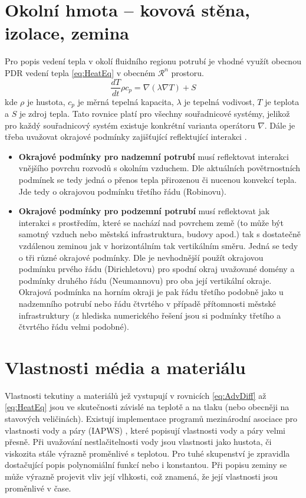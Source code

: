 \section{Okolní hmota – kovová stěna, izolace, zemina}
\label{sec:SurroundingMass}
Pro popis vedení tepla v okolí fluidního regionu potrubí je vhodné využít
obecnou PDR vedení tepla \ref{eq:HeatEq} v obecném \(\mathcal{R}^n\) prostoru.
\begin{equation}
  \label{eq:HeatEq}
  \frac{dT}{dt}\rho{c_p}=\nabla(\lambda\nabla{T})+S
\end{equation}
kde \(\rho\) je hustota, \(c_p\) je měrná tepelná kapacita, \(\lambda\) je
tepelná vodivost, \(T\) je teplota a \(S\) je zdroj tepla. Tato rovnice platí
pro všechny souřadnicové systémy, jelikož pro každý souřadnicový systém
existuje konkrétní varianta operátoru \(\nabla\). Dále je třeba uvažovat
okrajové podmínky zajišťující reflektující interakci .
\begin{itemize}
  \item
    \textbf{Okrajové podmínky pro nadzemní potrubí} musí reflektovat interakci
    vnějšího povrchu rozvodů s okolním vzduchem. Dle aktuálních povětrnostních
    podmínek se tedy jedná o přenos tepla přirozenou či nucenou
    konvekcí tepla. Jde tedy o okrajovou podmínku třetího řádu (Robinovu). 
  \item
    \textbf{Okrajové podmínky pro podzemní potrubí} musí reflektovat jak
    interakci s prostředím, které se nachází nad povrchem země (to může být
    samotný vzduch nebo městská infrastruktura, budovy apod.) tak s dostatečně
    vzdálenou zeminou jak v horizontálním tak vertikálním směru. Jedná se tedy
    o tři různé okrajové podmínky. Dle  je nevhodnější použít
    okrajovou podmínku prvého řádu (Dirichletovu) pro spodní okraj uvažované
    domény a podmínky druhého řádu (Neumannovu) pro oba její vertikální okraje.
    Okrajová podmínka na horním okraji je pak řádu třetího podobně jako u
    nadzemního potrubí nebo řádu čtvrtého v případě přítomnosti městské
    infrastruktury (z hlediska numerického řešení jsou si podmínky třetího a
    čtvrtého řádu velmi podobné).
\end{itemize}
\section{Vlastnosti média a materiálu}
Vlastnosti tekutiny a materiálů jež vystupují v rovnicích \ref{eq:AdvDiff} až
\ref{eq:HeatEq} jsou ve skutečnosti závislé na teplotě a na tlaku (nebo
obecněji na stavových veličinách). Existují implementace programů mezinárodní
asociace pro vlastnosti vody a páry (IAPWS) \cite{IAPWS2007}, které popisují
vlastnosti vody a páry velmi přesně. Při uvažování nestlačitelnosti vody jsou
vlastnosti jako hustota, či viskozita stále výrazně proměnlivé s teplotou. Pro
tuhé skupenství je zpravidla dostačující popis polynomiální funkcí nebo i
konstantou. Při popisu zeminy se může výrazně projevit vliv její vlhkosti, což
znamená, že její vlastnosti jsou proměnlivé v čase.


